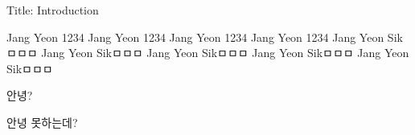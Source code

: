 Title: Introduction


Jang Yeon 1234
Jang Yeon 1234
Jang Yeon 1234
Jang Yeon 1234
Jang Yeon Sikㅁㅁㅁ
Jang Yeon Sikㅁㅁㅁ
Jang Yeon Sikㅁㅁㅁ
Jang Yeon Sikㅁㅁㅁ
Jang Yeon Sikㅁㅁㅁ





안녕?


안녕 못하는데?